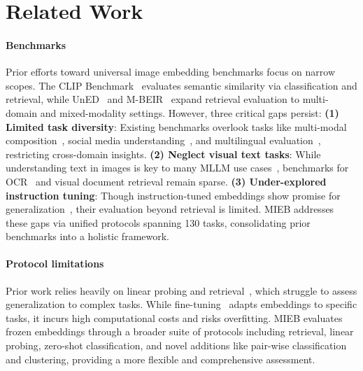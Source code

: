 \section{Related Work}

\paragraph{Benchmarks} Prior efforts toward universal image embedding benchmarks focus on narrow scopes. The CLIP Benchmark~\citep{radford2021learning} evaluates semantic similarity via classification and retrieval, while UnED~\citep{ypsilantis2023towards} and M-BEIR~\citep{wei2023uniir} expand retrieval evaluation to multi-domain and mixed-modality settings. However, three critical gaps persist: \textbf{(1) Limited task diversity}: Existing benchmarks overlook tasks like multi-modal composition~\citep{yuksekgonul2023aro}, social media understanding~\citep{jin2024mm}, and multilingual evaluation~\citep{pmlr-v162-bugliarello22a}, restricting cross-domain insights. \textbf{(2) Neglect visual text tasks}: While understanding text in images is key to many MLLM use cases~\citep{faysse2024colpali}, benchmarks for OCR~\citep{liu2024ocrbench} and visual document retrieval remain sparse. \textbf{(3) Under-explored instruction tuning}: Though instruction-tuned embeddings show promise for generalization~\citep{lin2025mmembed,zhang2024gme}, their evaluation beyond retrieval is limited. MIEB addresses these gaps via unified protocols spanning 130 tasks, consolidating prior benchmarks into a holistic framework.

\paragraph{Protocol limitations} Prior work relies heavily on linear probing and retrieval~\citep{he2019moco,radford2021learning}, which struggle to assess generalization to complex tasks. While fine-tuning~\citep{chen2020simclr} adapts embeddings to specific tasks, it incurs high computational costs and risks overfitting. MIEB evaluates frozen embeddings through a broader suite of protocols including retrieval, linear probing, zero-shot classification, and novel additions like pair-wise classification and clustering, providing a more flexible and comprehensive assessment.